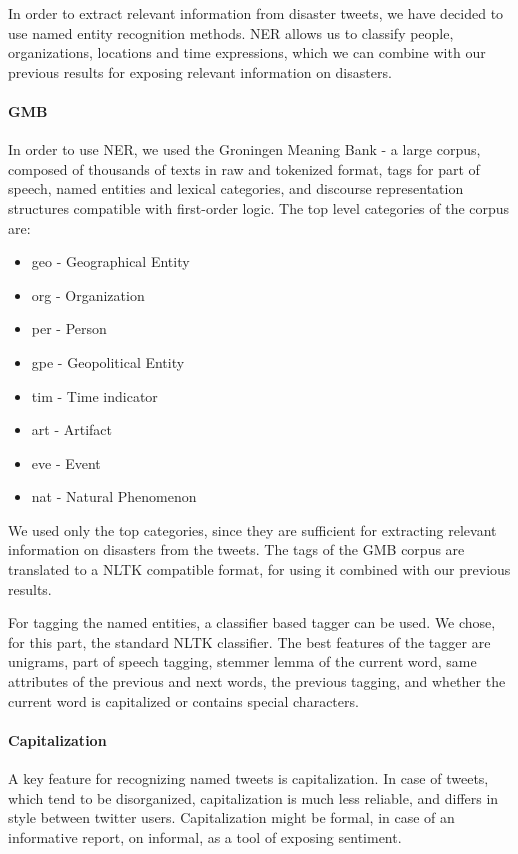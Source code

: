 \documentclass[letterpaper,twocolumn,10pt]{article}
\begin{document}
In order to extract relevant information from disaster tweets, we have decided to use named entity recognition methods. NER allows us to classify people, organizations, locations and time expressions, which we can combine with our previous results for exposing relevant information on disasters.

\paragraph{GMB} In order to use NER, we used the Groningen Meaning Bank - a large corpus, composed of thousands of texts in raw and tokenized format, tags for part of speech, named entities and lexical categories, and discourse representation structures compatible with first-order logic. The top level categories of the corpus are:
\begin{itemize}[noitemsep, nolistsep]
	\item geo - Geographical Entity
	\item org - Organization
	\item per - Person
	\item gpe - Geopolitical Entity
	\item tim - Time indicator
	\item art - Artifact
	\item eve - Event
	\item nat - Natural Phenomenon
\end{itemize}
We used only the top categories, since they are sufficient for extracting relevant information on disasters from the tweets. The tags of the GMB corpus are translated to a NLTK compatible format, for using it combined with our previous results.

For tagging the named entities, a classifier based tagger can be used. We chose, for this part, the standard NLTK classifier. The best features of the tagger are unigrams, part of speech tagging, stemmer lemma of the current word, same attributes of the previous and next words, the previous tagging, and whether the current word is capitalized or contains special characters.

\paragraph{Capitalization} A key feature for recognizing named tweets is capitalization. In case of tweets, which tend to be disorganized, capitalization is much less reliable, and differs in style between twitter users. Capitalization might be formal, in case of an informative report, on informal, as a tool of exposing sentiment.
\end{document}
